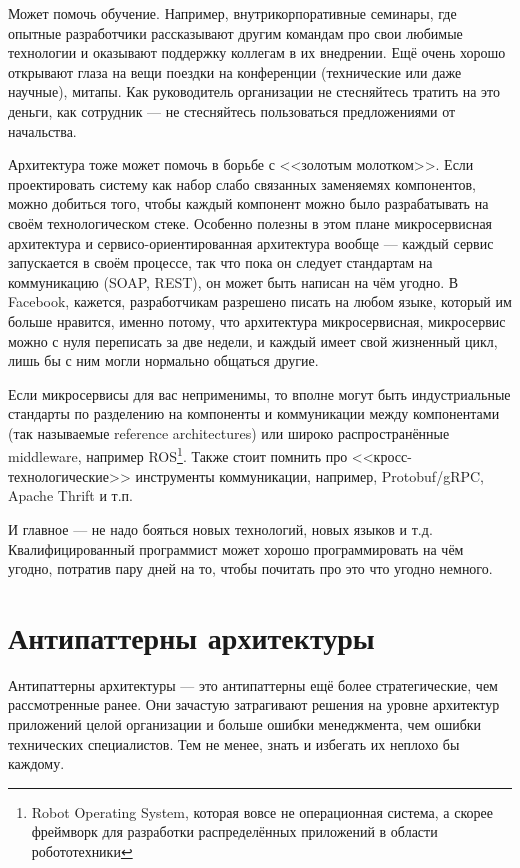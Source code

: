 \documentclass{../../text-style}
\begin{document}
Может помочь обучение. Например, внутрикорпоративные семинары, где опытные разработчики рассказывают другим командам про свои любимые технологии и оказывают поддержку коллегам в их внедрении. Ещё очень хорошо открывают глаза на вещи поездки на конференции (технические или даже научные), митапы. Как руководитель организации не стесняйтесь тратить на это деньги, как сотрудник --- не стесняйтесь пользоваться предложениями от начальства.

Архитектура тоже может помочь в борьбе с <<золотым молотком>>. Если проектировать систему как набор слабо связанных заменяемях компонентов, можно добиться того, чтобы каждый компонент можно было разрабатывать на своём технологическом стеке. Особенно полезны в этом плане микросервисная архитектура и сервисо-ориентированная архитектура вообще --- каждый сервис запускается в своём процессе, так что пока он следует стандартам на коммуникацию (SOAP, REST), он может быть написан на чём угодно. В Facebook, кажется, разработчикам разрешено писать на любом языке, который им больше нравится, именно потому, что архитектура микросервисная, микросервис можно с нуля переписать за две недели, и каждый имеет свой жизненный цикл, лишь бы с ним могли нормально общаться другие.

Если микросервисы для вас неприменимы, то вполне могут быть индустриальные стандарты по разделению на компоненты и коммуникации между компонентами (так называемые reference architectures) или широко распространённые middleware, например ROS\footnote{Robot Operating System, которая вовсе не операционная система, а скорее фреймворк для разработки распределённых приложений в области робототехники}. Также стоит помнить про <<кросс-технологические>> инструменты коммуникации, например, Protobuf/gRPC, Apache Thrift и т.п.

И главное --- не надо бояться новых технологий, новых языков и т.д. Квалифицированный программист может хорошо программировать на чём угодно, потратив пару дней на то, чтобы почитать про это что угодно немного.

\section{Антипаттерны архитектуры}

Антипаттерны архитектуры --- это антипаттерны ещё более стратегические, чем рассмотренные ранее. Они зачастую затрагивают решения на уровне архитектур приложений целой организации и больше ошибки менеджмента, чем ошибки технических специалистов. Тем не менее, знать и избегать их неплохо бы каждому.
\end{document}
